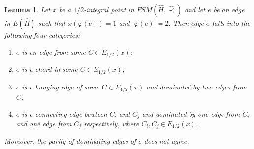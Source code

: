 \documentclass[11pt]{article}
\newtheorem{lemma}[theorem]{Lemma}
\numberwithin{theorem}{section}
\begin{document}
\begin{lemma}
\label{lem:prf3}
Let $x$ be a $1/2$-integral point in $FSM(\hat{H},\hat\prec)$ and let $e$ be an edge in $E(\hat{H})$ such that $x(\varphi(e))=1$ and $\lvert \varphi(e)\rvert=2$. Then edge $e$ falls into the following four categories:
\begin{enumerate}[label={\emph{(}\roman*\emph{)}}]
	\item $e$ is an edge from some $C\in E_{1/2}(x)$;
	\item $e$ is a chord in some $C\in E_{1/2}(x)$;
	\item $e$ is a hanging edge of some $C\in E_{1/2}(x)$ and dominated by two edges from $C$;
	\item $e$ is a connecting edge bewteen $C_i$ and $C_j$ and dominated by one edge from $C_i$ and one edge from $C_j$ respectively, where $C_i, C_j \in E_{1/2}(x)$.
\end{enumerate}
Moreover, the parity of dominating edges of $e$ does not agree.
\end{lemma} 
\end{document}
